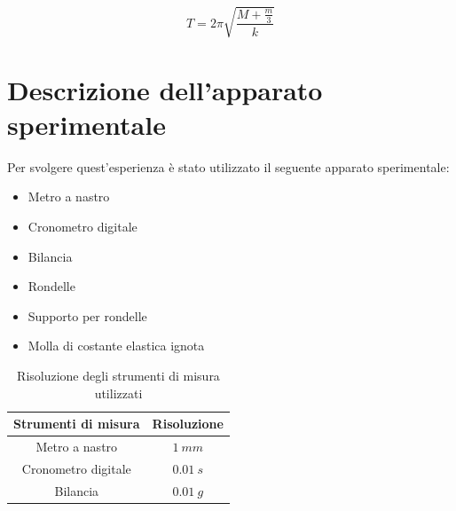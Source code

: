 \documentclass[11pt]{article}
\begin{document}
\begin{equation}
    T = 2\pi \sqrt{\frac{M + \frac{m}{3}}{k}}
\end{equation}

\section{Descrizione dell'apparato sperimentale}

Per svolgere quest'esperienza è stato utilizzato il seguente apparato sperimentale:
\begin{itemize}
    \item Metro a nastro
    \item Cronometro digitale
    \item Bilancia
    \item Rondelle
    \item Supporto per rondelle
    \item Molla di costante elastica ignota
\end{itemize}
\begin{table}[H]
\centering
\begin{tabular}{|c|c|}
\hline
\textbf{Strumenti di misura} & \textbf{Risoluzione} \\
\hline
Metro a nastro & $1\ mm$ \\
Cronometro digitale & $0.01\ s$ \\
Bilancia & $0.01\ g$ \\
\hline
\end{tabular}
\caption{Risoluzione degli strumenti di misura utilizzati}
\label{tab:}
\end{table}
\end{document}
